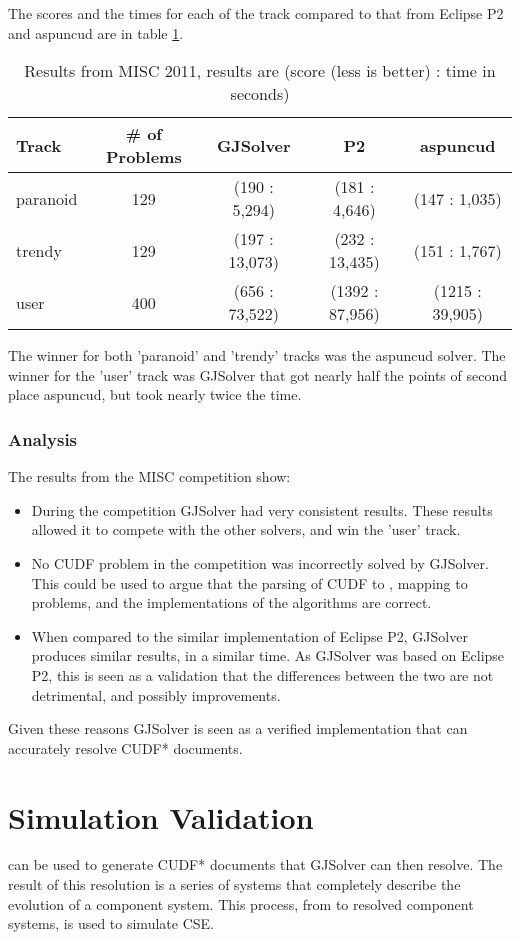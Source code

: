 The scores and the times for each of the track compared to that from Eclipse P2 and aspuncud are in table \ref{impl.misc2011}.
\begin{table}
\begin{tabular}{| l | c | c | c | c |}\hline
Track & \# of Problems & GJSolver & P2 & aspuncud\\ \hline
paranoid & 129 & (190 : 5,294) & (181 : 4,646) & (147 : 1,035) \\ \hline
trendy & 129 & (197 : 13,073) & (232 : 13,435) & (151 : 1,767) \\ \hline
user & 400 & (656 : 73,522) & (1392 : 87,956) & (1215 : 39,905) \\ \hline
\end{tabular}
\caption{Results from MISC 2011, results are (score (less is better) : time in seconds)}
\label{impl.misc2011}
\end{table}

The winner for both 'paranoid' and 'trendy' tracks was the aspuncud solver.
The winner for the 'user' track was GJSolver that got nearly half the points of second place aspuncud, but took nearly twice the time.

\subsubsection{Analysis}
The results from the MISC competition show:
\begin{itemize}
  \item During the competition GJSolver had very consistent results.
These results allowed it to compete with the other solvers, and win the 'user' track.
 \item No CUDF problem in the competition was incorrectly solved by GJSolver. 
 This could be used to argue that the parsing of CUDF to \modelname, mapping to \modelimpl problems, and the implementations of the algorithms are correct.
 \item When compared to the similar implementation of Eclipse P2, GJSolver produces similar results, in a similar time. 
 As GJSolver was based on Eclipse P2, this is seen as a validation that the differences between the two are not detrimental, and possibly improvements. 
\end{itemize}

Given these reasons GJSolver is seen as a verified implementation that can accurately resolve CUDF* documents.

\section{Simulation Validation}
\usermodel can be used to generate CUDF* documents that GJSolver can then resolve.
The result of this resolution is a series of systems that completely describe the evolution of a component system.
This process, from \usermodel to resolved component systems, is used to simulate CSE.

